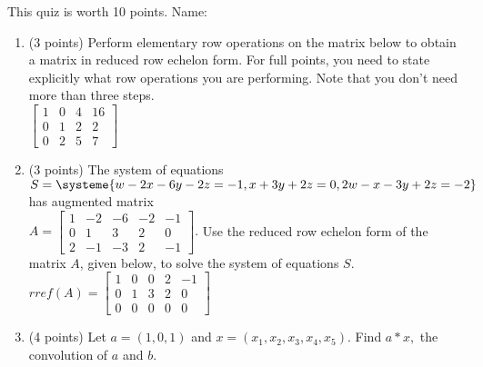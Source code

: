 \documentclass[11pt,fleqn]{article}
\newcommand{\bbm}{\begin{bmatrix}}
\newcommand{\ebm}{\end{bmatrix}}
\begin{document}
\renewcommand{\headrulewidth}{0pt}
\newcommand{\blank}[1]{\rule{#1}{0.75pt}}
\renewcommand{\d}{\displaystyle}
This quiz is worth 10 points. \hfill {\Large{Name: \underline{\hspace{2in}}}}
\begin{enumerate}
\item (3 points) Perform elementary row operations on the matrix below to obtain a matrix in reduced row echelon form. For full points, you need to state explicitly what row operations you are performing. Note that you don't need more than three steps.\\

$\bbm 1&0&4&16\\0&1&2&2\\0&2&5&7 \ebm$\\
\vfill

\item (3 points) The system of equations $S=\systeme{w-2x-6y-2z=-1,x+3y+2z=0,2w-x-3y+2z=-2}$ has augmented matrix\\ $A = \bbm 1&-2&-6&-2&-1\\0&1&3&2&0\\2&-1&-3&2&-1 \ebm.$  Use the reduced row echelon form of the matrix $A$, given below, to solve the system of equations $S$. \\

$rref(A)=\bbm 1&0&0&2&-1\\0&1&3&2&0\\0&0&0&0&0 \ebm$\\
\vspace{1in}
\newpage
\item (4 points) Let $a=(1,0,1)$ and $x=(x_1,x_2,x_3,x_4,x_5).$ Find $a*x,$ the convolution of $a$ and $b$.

\end{enumerate}
\end{document}
